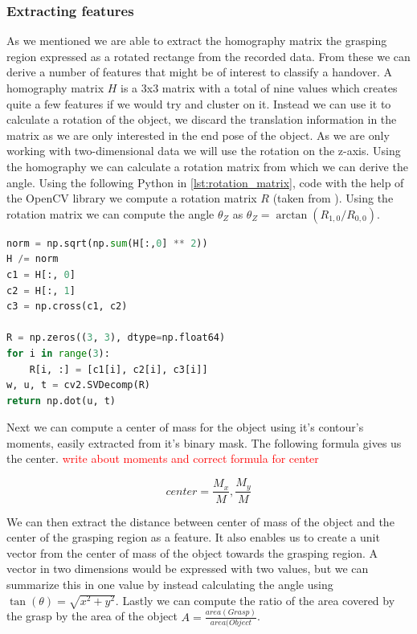 \subsubsection{Extracting features}

As we mentioned we are able to extract the homography matrix the grasping region expressed as a rotated rectange from the recorded data. From these we can derive a number of features that might be of interest to classify a handover. A homography matrix \(H\) is a 3x3 matrix with a total of nine values which creates quite a few features if we would try and cluster on it. Instead we can use it to calculate a rotation of the object, we discard the translation information in the matrix as we are only interested in the end pose of the object. As we are only working with two-dimensional data we will use the rotation on the z-axis. Using the homography we can calculate a rotation matrix from which we can derive the angle. Using the following Python in \ref{lst:rotation_matrix}, code with the help of the OpenCV library we compute a rotation matrix \(R\) (taken from \parencite{OpenCVHomographyDemo}). Using the rotation matrix we can compute the angle \(\theta_Z\) as \(\theta_Z = \arctan(R_{1,0} / R_{0,0})\).

\begin{lstlisting}[language=Python,frame=single,label={lst:rotation_matrix},caption={Python code to calculate rotation matrix from homography matrix using Opencv and numpy libraries}]
norm = np.sqrt(np.sum(H[:,0] ** 2))
H /= norm
c1 = H[:, 0]
c2 = H[:, 1]
c3 = np.cross(c1, c2)

R = np.zeros((3, 3), dtype=np.float64)
for i in range(3):
	R[i, :] = [c1[i], c2[i], c3[i]]
w, u, t = cv2.SVDecomp(R)
return np.dot(u, t)
\end{lstlisting}

Next we can compute a center of mass for the object using it's contour's moments, easily extracted from it's binary mask. The following formula gives us the center. \textcolor{red}{write about moments and correct formula for center}

\[
	center = \frac{M_x}{M}, \frac{M_y}{M}
\]

We can then extract the distance between center of mass of the object and the center of the grasping region as a feature. It also enables us to create a unit vector from the center of mass of the object towards the grasping region. A vector in two dimensions would be expressed with two values, but we can summarize this in one value by instead calculating the angle using \(\tan(\theta) = \sqrt{x^2 + y^2}\). Lastly we can compute the ratio of the area covered by the grasp by the area of the object \(A = \frac{area(Grasp)}{area(Object}\).

